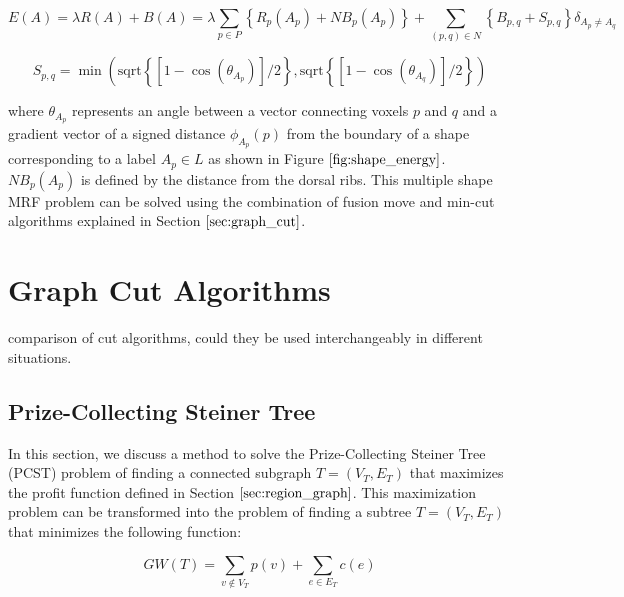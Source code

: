 \documentclass{SMBV12}
\begin{document}
\begin{equation}
E(A) = \lambda R(A) + B(A) = \lambda \sum_{p \in P} \left\lbrace  R_p(A_p) + NB_p(A_p) \right\rbrace + \sum_{(p, q) \in N} \left\lbrace B_{p, q} + S_{p, q} \right\rbrace \delta_{A_p \neq A_q}
\label{eq:mrf_multishape_energy}
\end{equation}

\begin{equation}
S_{p, q} = \min(\mathrm{sqrt}\left\lbrace [1 - \cos(\theta_{A_p})]/2 \right\rbrace, \mathrm{sqrt}\left\lbrace [1 - \cos(\theta_{A_q})]/2 \right\rbrace )
\end{equation}

where $\theta_{A_p}$ represents an angle between a vector connecting voxels $p$ and $q$ and a gradient vector of a signed distance $\phi_{A_p}(p)$ from the boundary of a shape corresponding to a label $A_p \in L$ as shown in Figure $\ref{fig:shape_energy}$. $NB_p(A_p)$ is defined by the distance from the dorsal ribs. This multiple shape MRF problem can be solved using the combination of fusion move and min-cut algorithms explained in Section $\ref{sec:graph_cut}$.

\section{Graph Cut Algorithms}

comparison of cut algorithms, could they be used interchangeably in different situations.

\subsection{Prize-Collecting Steiner Tree}
\label{sec:branch_and_cut}

In this section, we discuss a method to solve the Prize-Collecting Steiner Tree (PCST) problem \cite{ljubic2006algorithmic} of finding a connected subgraph $T = (V_T, E_T)$ that maximizes the profit function defined in Section $\ref{sec:region_graph}$. This maximization problem can be transformed into the problem of finding a subtree $T = (V_T, E_T)$ that minimizes the following function:

\begin{equation}
GW(T) = \sum\limits_{v \notin V_T} p(v) + \sum\limits_{e \in E_T} c(e)
\end{equation}
\end{document}
